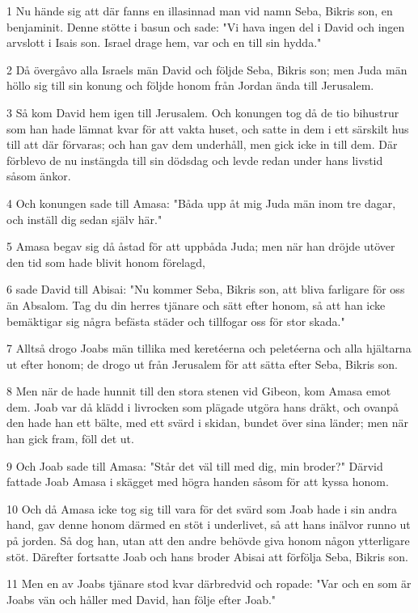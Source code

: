 \par 1 Nu hände sig att där fanns en illasinnad man vid namn Seba, Bikris son, en benjaminit. Denne stötte i basun och sade: "Vi hava ingen del i David och ingen arvslott i Isais son. Israel drage hem, var och en till sin hydda."
\par 2 Då övergåvo alla Israels män David och följde Seba, Bikris son; men Juda män höllo sig till sin konung och följde honom från Jordan ända till Jerusalem.
\par 3 Så kom David hem igen till Jerusalem. Och konungen tog då de tio bihustrur som han hade lämnat kvar för att vakta huset, och satte in dem i ett särskilt hus till att där förvaras; och han gav dem underhåll, men gick icke in till dem. Där förblevo de nu instängda till sin dödsdag och levde redan under hans livstid såsom änkor.
\par 4 Och konungen sade till Amasa: "Båda upp åt mig Juda män inom tre dagar, och inställ dig sedan själv här."
\par 5 Amasa begav sig då åstad för att uppbåda Juda; men när han dröjde utöver den tid som hade blivit honom förelagd,
\par 6 sade David till Abisai: "Nu kommer Seba, Bikris son, att bliva farligare för oss än Absalom. Tag du din herres tjänare och sätt efter honom, så att han icke bemäktigar sig några befästa städer och tillfogar oss för stor skada."
\par 7 Alltså drogo Joabs män tillika med keretéerna och peletéerna och alla hjältarna ut efter honom; de drogo ut från Jerusalem för att sätta efter Seba, Bikris son.
\par 8 Men när de hade hunnit till den stora stenen vid Gibeon, kom Amasa emot dem. Joab var då klädd i livrocken som plägade utgöra hans dräkt, och ovanpå den hade han ett bälte, med ett svärd i skidan, bundet över sina länder; men när han gick fram, föll det ut.
\par 9 Och Joab sade till Amasa: "Står det väl till med dig, min broder?" Därvid fattade Joab Amasa i skägget med högra handen såsom för att kyssa honom.
\par 10 Och då Amasa icke tog sig till vara för det svärd som Joab hade i sin andra hand, gav denne honom därmed en stöt i underlivet, så att hans inälvor runno ut på jorden. Så dog han, utan att den andre behövde giva honom någon ytterligare stöt. Därefter fortsatte Joab och hans broder Abisai att förfölja Seba, Bikris son.
\par 11 Men en av Joabs tjänare stod kvar därbredvid och ropade: "Var och en som är Joabs vän och håller med David, han följe efter Joab."
